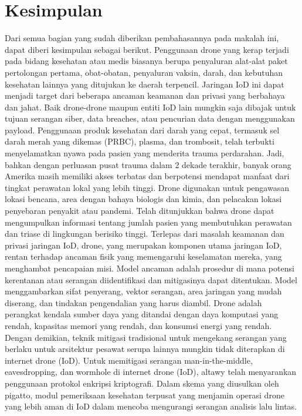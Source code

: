 \section{Kesimpulan}
\label{sec:kesimpulan}


Dari semua bagian yang sudah diberikan pembahasannya pada makalah ini, dapat diberi kesimpulan sebagai berikut. Penggunaan drone yang kerap terjadi pada bidang kesehatan atau medis biasanya berupa penyaluran alat-alat paket pertolongan pertama, obat-obatan, penyaluran vaksin, darah, dan kebutuhan kesehatan lainnya yang ditujukan ke daerah terpencil. Jaringan IoD ini dapat menjadi target dari beberapa ancaman keamanan dan privasi yang berbahaya dan jahat. Baik drone-drone maupun entiti IoD lain mungkin saja dibajak untuk tujuan serangan siber, data breaches, atau pencurian data dengan menggunakan payload. Penggunaan produk kesehatan  dari darah yang cepat, termasuk sel darah merah yang dikemas (PRBC), plasma, dan trombosit, telah terbukti menyelamatkan nyawa pada pasien yang menderita trauma perdarahan. Jadi, bahkan dengan perluasan pusat trauma dalam 2 dekade terakhir, banyak orang Amerika masih memiliki akses terbatas dan berpotensi mendapat manfaat dari tingkat perawatan lokal yang lebih tinggi. Drone digunakan untuk pengawasan lokasi bencana, area dengan bahaya biologis dan kimia, dan pelacakan lokasi penyebaran penyakit atau pandemi. Telah ditunjukkan bahwa drone dapat mengumpulkan informasi tentang jumlah pasien yang membutuhkan perawatan dan triase di lingkungan berisiko tinggi. Terlepas dari masalah keamanan dan privasi jaringan IoD, drone, yang merupakan komponen utama jaringan IoD, rentan terhadap ancaman fisik yang memengaruhi keselamatan mereka, yang menghambat pencapaian misi. Model ancaman adalah prosedur di mana potensi kerentanan atau serangan diidentifikasi dan mitigasinya dapat ditentukan. Model menggambarkan sifat penyerang, vektor serangan, area jaringan yang mudah diserang, dan tindakan pengendalian yang harus diambil. Drone adalah perangkat kendala sumber daya yang ditandai dengan daya komputasi yang rendah, kapasitas memori yang rendah, dan konsumsi energi yang rendah. Dengan demikian, teknik mitigasi tradisional untuk mengekang serangan yang berlaku untuk arsitektur pesawat serupa lainnya mungkin tidak diterapkan di internet drone (IoD). Untuk memitigasi serangan man-in-the-middle, eavesdropping, dan wormhole di internet drone (IoD), altawy telah menyarankan penggunaan protokol enkripsi kriptografi. Dalam skema yang diusulkan oleh pigatto, modul pemeriksaan kesehatan terpusat yang menjamin operasi drone yang lebih aman di IoD dalam mencoba mengurangi serangan analisis lalu lintas. 
